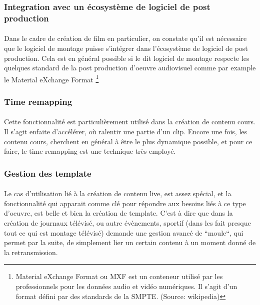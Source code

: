 \subsubsection{Integration avec un écosystème de logiciel de post production}
\paragraph{}
Dans le cadre de création de film en particulier, on constate qu'il est nécessaire
que le logiciel de montage puisse s'intégrer dans l'écosystème de logiciel de post
production. Cela est en général possible si le dit logiciel de montage respecte les
quelques standard de la post production d'oeuvre audiovisuel comme par example le
Material eXchange Format \footnote{Material eXchange Format ou MXF est un conteneur
utilisé par les professionnels pour les données audio et vidéo numériques.
Il s'agit d'un format défini par des standards de la SMPTE. (Source: wikipedia)}

\subsubsection{Time remapping}
\paragraph{ }
Cette fonctionnalité est particulièrement utilisé dans la création de contenu cours.
Il s'agit enfaite d'accélérer, où ralentir une partie d'un clip. Encore une fois,
les contenu cours, cherchent en général à être le plus dynamique possible, et pour
ce faire, le time remapping est une technique très employé.

\subsubsection{Gestion des template}
\paragraph{ }
Le cas d'utilisation lié à la création de contenu live, est assez spécial, et la fonctionnalité
qui apparait comme clé pour répondre aux besoins liés à ce type d'oeuvre, est belle et bien la
création de template. C'est à dire que dans la création de journaux télévisé, ou autre évènements,
sportif (dans les fait presque tout ce qui est montage télévisé) demande une gestion avancé de ``moule``,
qui permet par la suite, de simplement lier un certain contenu à un moment donné de la retransmission.


